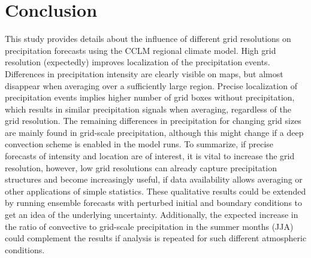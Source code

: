 \section{Conclusion}




This study provides details about the influence of different grid resolutions on precipitation forecasts using the CCLM regional climate model. High grid resolution (expectedly) improves localization of the precipitation events. Differences in precipitation intensity are clearly visible on maps, but almost disappear when averaging over a sufficiently large region. Precise localization of precipitation events implies higher number of grid boxes without precipitation, which results in similar precipitation signals when averaging, regardless of the grid resolution. The remaining differences in precipitation for changing grid sizes are mainly found in grid-scale precipitation, although this might change if a deep convection scheme is enabled in the model runs. To summarize, if precise forecasts of intensity and location are of interest, it is vital to increase the grid resolution, however, low grid resolutions can already capture precipitation structures and become increasingly useful, if data availability allows averaging or other applications of simple statistics. These qualitative results could be extended by running ensemble forecasts with perturbed initial and boundary conditions to get an idea of the underlying uncertainty. Additionally, the expected increase in the ratio of convective to grid-scale precipitation in the summer months (JJA) could complement the results if analysis is repeated for such different atmospheric conditions.